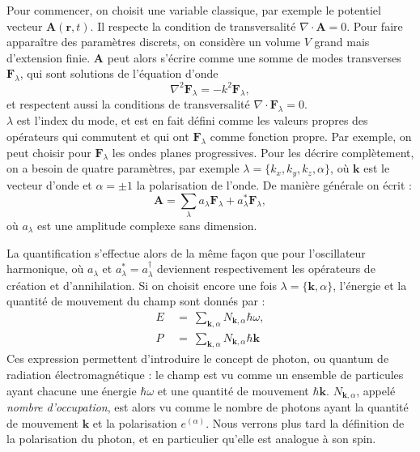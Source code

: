 Pour commencer, on choisit une variable classique, par exemple le potentiel vecteur $\bm{A}(\bm{r},t)$. Il respecte la condition de transversalité $\nabla\cdot\bm{A}=0$. Pour faire apparaître des paramètres discrets, on considère un volume $V$ grand mais d'extension finie. $\bm{A}$ peut alors s'écrire comme une somme de modes transverses $\bm{F}_\lambda$, qui sont solutions de l'équation d'onde
\begin{equation*}
\nabla^2\bm{F}_\lambda=-k^2\bm{F}_\lambda,
\end{equation*}
et respectent aussi la conditions de transversalité $\nabla\cdot\bm{F}_\lambda=0$.\\
$\lambda$ est l'index du mode, et est en fait défini comme les valeurs propres des opérateurs qui commutent et qui ont $\bm{F}_\lambda$ comme fonction propre. Par exemple, on peut choisir pour $\bm{F}_\lambda$ les ondes planes progressives. Pour les décrire complètement, on a besoin de quatre paramètres, par exemple $\lambda = \{k_x, k_y, k_z, \alpha\}$, où $\bm{k}$ est le vecteur d'onde et $\alpha=\pm1$ la polarisation de l'onde. De manière générale on écrit :
\begin{equation}
\bm{A}=\sum_{\lambda}{a_{\lambda}\bm{F}_\lambda+a^*_{\lambda}\bm{F}_\lambda},
\label{A_decomp_Flambda}
\end{equation}
où $a_{\lambda}$ est une amplitude complexe sans dimension. 

La quantification s'effectue alors de la même façon que pour l'oscillateur harmonique, où $a_{\lambda}$ et $a^*_{\lambda} = a^{\dag}_{\lambda}$ deviennent respectivement les opérateurs de création et d'annihilation. Si on choisit encore une fois $\lambda = \{\bm{k}, \alpha\}$, l'énergie et la quantité de mouvement du champ sont donnés par :
\begin{align*}
E~&=~\sum_{\bm{k},\alpha}{N_{\bm{k},\alpha} \hbar\omega}, \\
P~&=~\sum_{\bm{k},\alpha}{N_{\bm{k},\alpha} \hbar\bm{k}}
\end{align*}
Ces expression permettent d'introduire le concept de photon, ou quantum de radiation électromagnétique : le champ est vu comme un ensemble de particules ayant chacune une énergie $\hbar\omega$ et une quantité de mouvement $\hbar\bm{k}$. $N_{\bm{k},\alpha}$, appelé \textit{nombre d'occupation}, est alors vu comme le nombre de photons ayant la quantité de mouvement $\bm{k}$ et la polarisation $e^{(\alpha)}$. Nous verrons plus tard la définition de la polarisation du photon, et en particulier qu'elle est analogue à son spin. 

